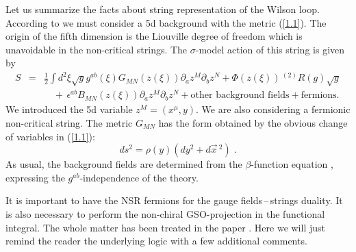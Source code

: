 \documentclass[a4paper,12pt]{article}
\numberwithin{equation}{section}
\begin{document}
Let us summarize the facts about string representation of the Wilson loop. According
to \cite{1} we must consider a 5d background with the metric (\ref{1.1}).
The origin of the fifth dimension is the Liouville degree of freedom which is
unavoidable in the non-critical strings. The \( \sigma  \)-model action of
this string is given by
\begin{eqnarray}
S & = & \frac{1}{2}\int d^{2}\xi \sqrt{{g}}g^{ab}(\xi )G_{MN}(z(\xi ))\partial _{a}z^{M}\partial _{b}z^{N}+\Phi (z(\xi ))\, ^{(2)}\! R(g)\sqrt{{g}}\nonumber \\
 &  & \quad +\, \epsilon ^{ab}B_{MN}(z(\xi ))\partial _{a}z^{M}\partial _{b}z^{N}+\textrm{other background fields}+\textrm{fermions}.\label{3.1} 
\end{eqnarray}
 We introduced the 5d variable \( z^{M}=(x^{\mu },y) \). We are also considering
a fermionic non-critical string. The metric \( G_{MN} \) has the form obtained
by the obvious change of variables in (\ref{1.1}):
\begin{equation}
\label{3.2}
ds^{2}=\rho (y)(dy^{2}+d\vec{x}\, ^{2})\; .
\end{equation}
 As usual, the background fields are determined from the \( \beta  \)-function
equation \cite{11}, expressing the \( g^{ab} \)-independence of the theory. 

It is important to have the NSR fermions for the gauge fields\,--\,strings duality.
It is also necessary to perform the non-chiral GSO-projection in the functional
integral. The whole matter has been treated in the paper \cite{12}. Here we
will just remind the reader the underlying logic with a few additional comments.
\end{document}
